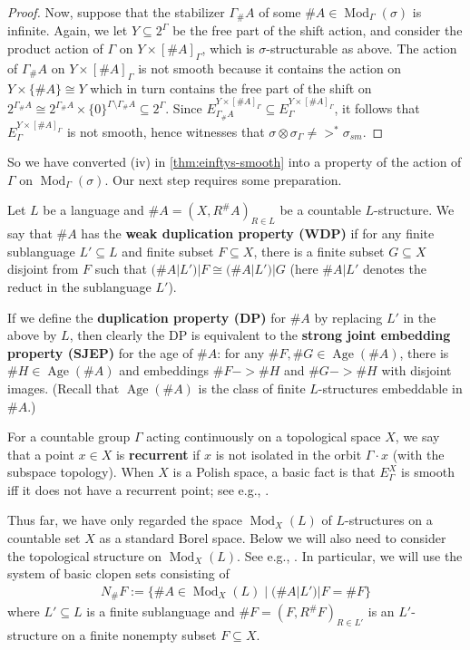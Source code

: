 \documentclass[11pt]{article}
\newcommand*\defn{\textbf}
\DeclareMathOperator\Mod{Mod}
\DeclareMathOperator\Age{Age}
\begin{document}
\begin{proof}
Now, suppose that the stabilizer $\Gamma_\#A$ of some $\#A \in \Mod_\Gamma(\sigma)$ is infinite.  Again, we let $Y \subseteq 2^\Gamma$ be the free part of the shift action, and consider the product action of $\Gamma$ on $Y \times [\#A]_\Gamma$, which is $\sigma$-structurable as above.  The action of $\Gamma_\#A$ on $Y \times [\#A]_\Gamma$ is not smooth because it contains the action on $Y \times \{\#A\} \cong Y$ which in turn contains the free part of the shift on $2^{\Gamma_\#A} \cong 2^{\Gamma_\#A} \times \{0\}^{\Gamma \setminus \Gamma_\#A} \subseteq 2^\Gamma$.  Since $E_{\Gamma_\#A}^{Y \times [\#A]_\Gamma} \subseteq E_\Gamma^{Y \times [\#A]_\Gamma}$, it follows that $E_\Gamma^{Y \times [\#A]_\Gamma}$ is not smooth, hence witnesses that $\sigma \otimes \sigma_\Gamma \not=>^* \sigma_{sm}$.
\end{proof}

So we have converted (iv) in \cref{thm:einftys-smooth} into a property of the action of $\Gamma$ on $\Mod_\Gamma(\sigma)$.  Our next step requires some preparation.

Let $L$ be a language and $\#A = (X, R^\#A)_{R \in L}$ be a countable $L$-structure.  We say that $\#A$ has the \defn{weak duplication property (WDP)} if for any finite sublanguage $L' \subseteq L$ and finite subset $F \subseteq X$, there is a finite subset $G \subseteq X$ disjoint from $F$ such that $(\#A|L')|F \cong (\#A|L')|G$ (here $\#A|L'$ denotes the reduct in the sublanguage $L'$).

\begin{remark}
If we define the \defn{duplication property (DP)} for $\#A$ by replacing $L'$ in the above by $L$, then clearly the DP is equivalent to the \defn{strong joint embedding property (SJEP)} for the age of $\#A$: for any $\#F, \#G \in \Age(\#A)$, there is $\#H \in \Age(\#A)$ and embeddings $\#F -> \#H$ and $\#G -> \#H$ with disjoint images.  (Recall that $\Age(\#A)$ is the class of finite $L$-structures embeddable in $\#A$.)
\end{remark}

For a countable group $\Gamma$ acting continuously on a topological space $X$, we say that a point $x \in X$ is \defn{recurrent} if $x$ is not isolated in the orbit $\Gamma \cdot x$ (with the subspace topology).  When $X$ is a Polish space, a basic fact is that $E_\Gamma^X$ is smooth iff it does not have a recurrent point; see e.g., \cite[22.3]{Kgaega}.

Thus far, we have only regarded the space $\Mod_X(L)$ of $L$-structures on a countable set $X$ as a standard Borel space.  Below we will also need to consider the topological structure on $\Mod_X(L)$.  See e.g., \cite[16.C]{Kcdst}.  In particular, we will use the system of basic clopen sets consisting of
\begin{align*}
N_\#F := \{\#A \in \Mod_X(L) \mid (\#A|L')|F = \#F\}
\end{align*}
where $L' \subseteq L$ is a finite sublanguage and $\#F = (F, R^\#F)_{R \in L'}$ is an $L'$-structure on a finite nonempty subset $F \subseteq X$.
\end{document}
